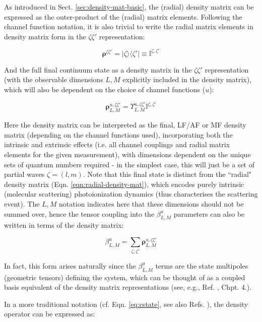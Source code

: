 \documentclass[10pt]{article}
\begin{document}
As introduced in Sect. \ref{sec:density-mat-basic}, the (radial) density matrix can be expressed as the outer-product of the (radial) matrix elements. Following the channel function notation, it is also trivial to write the radial matrix elements in density matrix form in the $\zeta\zeta'$ representation:

\begin{equation}
\mathbf{\rho}^{\zeta\zeta'} = |\zeta\rangle\langle\zeta'| \equiv \mathbb{I}^{\zeta,\zeta'}
\end{equation}

And the full final continuum state as a density matrix in the $\zeta\zeta'$ representation (with the observable dimensions $L,M$ explicitly included in the density matrix), which will also be dependent on the choice of channel functions ($u$):

\begin{equation}
\mathbf{\rho}_{L,M}^{u,\zeta\zeta'}=\varUpsilon_{L,M}^{u,\zeta\zeta'}\mathbb{I}^{\zeta,\zeta'}
\end{equation}

Here the density matrix can be interpreted as the final, LF/AF or
MF density matrix (depending on the channel functions used), incorporating both the intrinsic and extrinsic
effects (i.e. all channel couplings and radial matrix elements for
the given measurement), with dimensions dependent on the unique sets of quantum numbers required - in the simplest case, this will just be a set of partial waves $\zeta = (l,m)$. Note that this final state is distinct from the ``radial" density matrix (Eqn. \ref{eqn:radial-density-mat}), which encodes purely intrinsic (molecular scattering) photoionization dynamics (thus characterises the scattering event). The $L,M$ notation indicates here that these dimensions should not be summed over, hence the tensor coupling into the $\beta_{L,M}^{u}$ parameters can also be written in terms of the density matrix:

\begin{equation}
\beta_{L,M}^{u}=\sum_{\zeta,\zeta'}\mathbf{\rho}_{L,M}^{u,\zeta\zeta'}
\end{equation}

In fact, this form arises naturally since the $\beta_{L,M}^{u}$ terms are the state multipoles (geometric tensors) defining the system, which can be thought of as a coupled basis equivalent of the density matrix representations (see, e.g., Ref. \cite{BlumDensityMat}, Chpt. 4.).

In a more traditional notation (cf. Eqn. \ref{eq:cstate}, see also Refs. \cite{gregory2021MolecularFramePhotoelectron} 
), the density operator can be expressed as:
\end{document}
